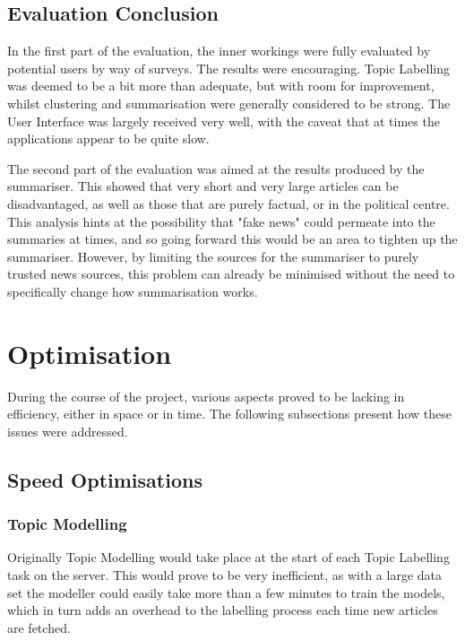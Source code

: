 \documentclass[12pt]{article}
\begin{document}
\subsection{Evaluation Conclusion}

In the first part of the evaluation, the inner workings were fully evaluated by potential users by way of surveys. The results were encouraging. Topic Labelling was deemed to be a bit more than adequate, but with room for improvement, whilst clustering and summarisation were generally considered to be strong. The User Interface was largely received very well, with the caveat that at times the applications appear to be quite slow. 

The second part of the evaluation was aimed at the results produced by the summariser. This showed that very short and very large articles can be disadvantaged, as well as those that are purely factual, or in the political centre. This analysis hints at the possibility that "fake news" could permeate into the summaries at times, and so going forward this would be an area to tighten up the summariser. However, by limiting the sources for the summariser to purely trusted news sources, this problem can already be minimised without the need to specifically change how summarisation works.


\newpage

\section{Optimisation}

During the course of the project, various aspects proved to be lacking in efficiency, either in space or in time. The following subsections present how these issues were addressed. 

\subsection{Speed Optimisations}

\subsubsection{Topic Modelling}

Originally Topic Modelling would take place at the start of each Topic Labelling task on the server. This would prove to be very inefficient, as with a large data set the modeller could easily take more than a few minutes to train the models, which in turn adds an overhead to the labelling process each time new articles are fetched.
\end{document}
